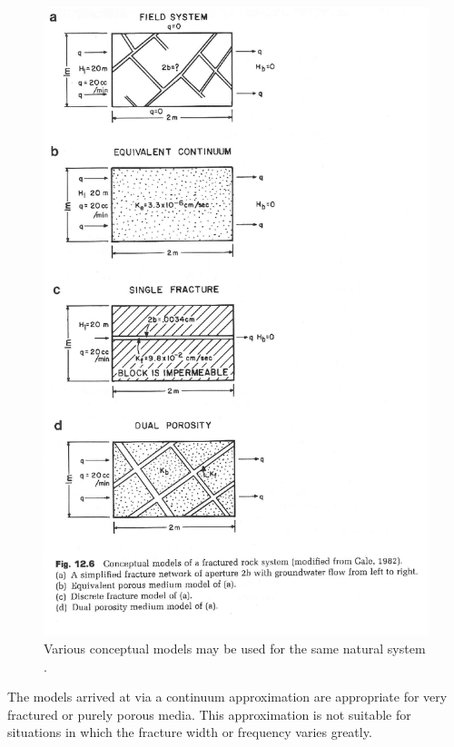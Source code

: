 \begin{figure}[htbp!]
  \begin{center}
    \includegraphics{./chapters/litrev/fractureModels.eps}
  \end{center}
  \caption{Various conceptual models may be used for the same natural system 
  \cite{anderson_applied_1992}.}
  \label{fig:fractureModels}
\end{figure}


The models arrived at via a continuum approximation are appropriate
for very fractured or purely porous media. This approximation is not 
suitable for situations in which the fracture width or frequency varies greatly.


